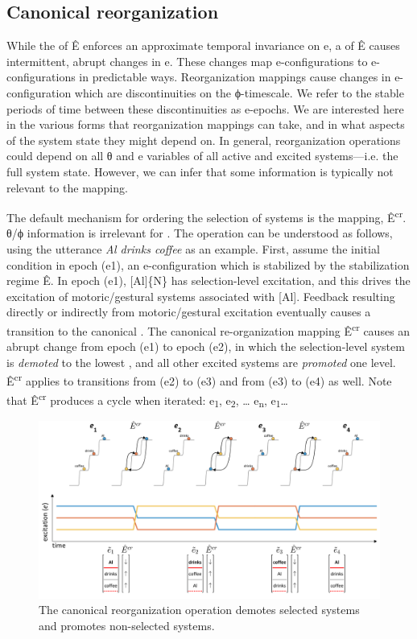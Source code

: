 \subsection{Canonical reorganization}

While the  of Ê enforces an approximate temporal invariance on e, a  of Ê causes intermittent, abrupt changes in e. These changes map e-configurations to e-configurations in predictable ways. Reorganization mappings cause changes in e-configuration which are discontinuities on the ϕ-timescale. We refer to the stable periods of time between these discontinuities as e-epochs. We are interested here in the various forms that reorganization mappings can take, and in what aspects of the system state they might depend on. In general, reorganization operations could depend on all θ and e variables of all active and excited systems—i.e. the full system state. However, we can infer that some information is typically not relevant to the mapping. 

  The default mechanism for ordering the selection of systems is the  mapping, Ê\textsuperscript{cr}. θ/ϕ information is irrelevant for . The operation  can be understood as follows, using the utterance \textit{Al drinks coffee} as an example. First, assume the initial condition in epoch (e1), an e-configuration which is stabilized by the stabilization regime Ê. In epoch (e1), [Al]\{N\} has selection-level excitation, and this drives the excitation of motoric/gestural systems associated with [Al]. Feedback resulting directly or indirectly from motoric/gestural excitation eventually causes a transition to the canonical . The canonical re-organization mapping Ê\textsuperscript{cr} causes an abrupt change from epoch (e1) to epoch (e2), in which the selection-level system is \textit{demoted} to the lowest , and all other excited systems are \textit{promoted} one level. Ê\textsuperscript{cr} applies to transitions from (e2) to (e3) and from (e3) to (e4) as well. Note that Ê\textsuperscript{cr} produces a cycle when iterated: e\textsubscript{1}, e\textsubscript{2}, … e\textsubscript{n}, e\textsubscript{1}… 

  
\begin{figure}
\includegraphics[width=\textwidth]{figures/Tilsen-img25.png}
\caption{The canonical reorganization operation demotes selected systems and promotes non-selected systems.}
\label{fig:2:18}
\end{figure}
 

